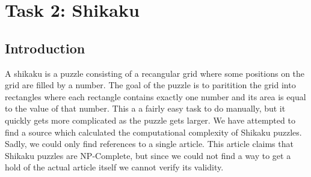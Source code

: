 \section{Task 2: Shikaku}\label{sec:shikaku}
\subsection{Introduction}

A shikaku is a puzzle consisting of a recangular grid where some positions on the grid are filled by a number. The goal of the puzzle is to paritition the grid into rectangles where each rectangle contains exactly one number and its area is equal to the value of that number. This a a fairly easy task to do manually, but it quickly gets more complicated as the puzzle gets larger. We have attempted to find a source which calculated the computational complexity of Shikaku puzzles. Sadly, we could only find references to a single article\cite{Takenaga}. This article claims that Shikaku puzzles are NP-Complete, but since we could not find a way to get a hold of the actual article itself we cannot verify its validity. \\





